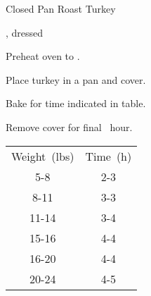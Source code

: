 \begin{recipe}{Closed Pan Roast Turkey}{}{}

\begin{ingredients}
\item {}, dressed
\end{ingredients}

\begin{directions}
\item Preheat oven to .
\item Place turkey in a pan and cover.
\item Bake for time indicated in table.
\item Remove cover for final \half~hour.
\end{directions}

\begin{tabular}{|cc|}
\hline
Weight~(lbs) & Time~(h) \\
5-8 & 2\half{}-3 \\
8-11 &  3-3\half{} \\
11-14 & 3\half{}-4 \\
15-16 & 4-4\quarter{} \\
16-20 & 4\quarter{}-4\half{} \\
20-24 & 4\half{}-5 \\
\hline
\end{tabular}
\end{recipe}
